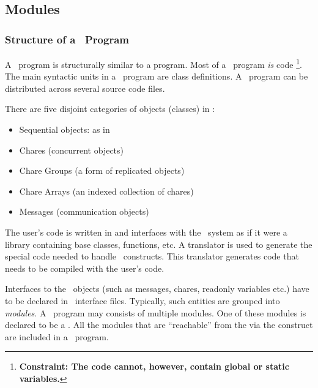 \subsection{Modules}

\subsubsection{Structure of a \charmpp\ Program}

A \charmpp\ program is structurally similar to a \CC{} program.  Most of a
\charmpp\ program {\em is} \CC{} code \footnote{\bf Constraint: The \CC{} code
cannot, however, contain global or static variables.}. The main syntactic units
in a \charmpp\ program are class definitions. A \charmpp\ program can be
distributed across several source code files.

There are five disjoint categories of objects (classes) in \charmpp:

\begin{itemize}
\item Sequential objects: as in \CC{}
\item Chares (concurrent objects) 
\item Chare Groups  (a form of replicated objects)
\item Chare Arrays  (an indexed collection of chares)
\item Messages (communication objects)
\end{itemize}

The user's code is written in \CC{} and interfaces with the \charmpp\ system as
if it were a library containing base classes, functions, etc.  A translator is
used to generate the special code needed to handle \charmpp\ constructs.  This
translator generates \CC{} code that needs to be compiled with the user's code.

Interfaces to the \charmpp\ objects (such as messages, chares, readonly
variables etc.)  have to be
declared in \charmpp\ interface files. Typically, such entities are grouped
 into {\em modules}. A \charmpp\ program may consists of multiple
modules.  One of these modules is declared to be a . All the
modules that are ``reachable'' from the  via the 
construct are included in a \charmpp\ program.

